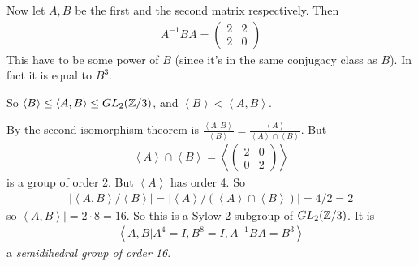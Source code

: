 \documentclass[a4paper]{article}
\begin{document}
Now let $A,B$ be the first and the second matrix respectively. Then
\begin{equation*}
\begin{aligned}
A^{-1}BA =\left(\begin{matrix}
2 & 2\\
2 & 0
\end{matrix}\right)
\end{aligned}
\end{equation*}
This have to be some power of $B$ (since it's in the same conjugacy class as $B$). In fact it is equal to $B^3$.

So $\left<B\right> \leq \left<A,B\right> \leq GL_2(\mathbb{Z}/3)$, and $\left<B\right> \triangleleft \left<A,B\right>$.

By the second isomorphism theorem is $\frac{\left<A,B\right>}{\left<B\right>} = \frac{\left<A\right>}{\left<A\right> \cap \left<B\right>}$. But
\begin{equation*}
\begin{aligned}
\left<A\right> \cap \left<B\right> = \left<\left(\begin{matrix}
2 & 0\\
0 & 2
\end{matrix}\right)\right>
\end{aligned}
\end{equation*}
is a group of order 2. But $\left<A\right>$ has order 4. So
\begin{equation*}
\begin{aligned}
\left|\left<A,B\right>/\left<B\right>\right| = \left|\left<A\right>/(\left<A\right>\cap\left<B\right>)\right| = 4/2 = 2
\end{aligned}
\end{equation*}
so $\left<A,B\right>| = 2\cdot 8 = 16$. So this is a Sylow 2-subgroup of $GL_2(\mathbb{Z}/3)$. It is
\begin{equation*}
\begin{aligned}
\left<A,B | A^4 = I, B^8 = I, A^{-1}BA = B^3\right>
\end{aligned}
\end{equation*}
a \emph{semidihedral group of order 16}.
\end{document}
